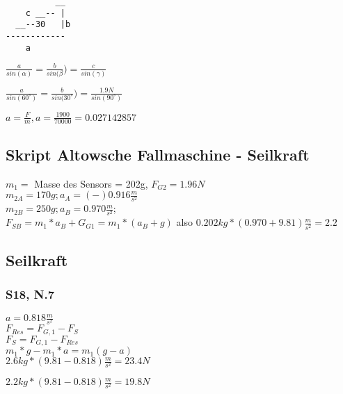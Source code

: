 \documentclass[11pt,twoside,a4paper]{article}
\begin{document}
        \begin{verbatim}
          __
    c __-- |
  __--30   |b
------------
    a
        \end{verbatim}

        \(\frac{a}{sin(\alpha)} = \frac{b}{sin(\beta}) = \frac{c}{sin(\gamma)}\)

        \(\frac{a}{sin(60^\circ)} = \frac{b}{sin(30^\circ}) = \frac{1.9N}{sin(90^\circ)}\)

        \(a = \frac{F}{m}, a = \frac{1900}{70000} = 0.027142857\)

        \subsection{Skript Altowsche Fallmaschine - Seilkraft}


        \(m_1 = \) Masse des Sensors = 202g, \(F_{G2} = 1.96N\)\\
        \(m_{2A} = 170g; a_A = (-)0.916\frac{m}{s^2}\)\\
        \(m_{2B} = 250g; a_B = 0.970\frac{m}{s^2}\);\\


        \(F_{SB} = m_1 * a_B + G_{G1} = m_1 * (a_B + g)\) also \(0.202kg * (0.970 + 9.81)\frac{m}{s^2} = 2.2\)

        \subsection{Seilkraft}
        \subsubsection{S18, N.7}

        \(a = 0.818\frac{m}{s^2}\)\\
        \(F_{Res} = F_{G,1} - F_S\)\\
        \(F_S = F_{G,1} - F_{Res}\)\\
        \(m_1 * g - m_1 * a = m_1(g-a)\)\\
        \(2.6kg * (9.81 - 0.818) \frac{m}{s^2} = 23.4N\)

        \(2.2kg * (9.81 - 0.818) \frac{m}{s^2} = 19.8N\)
        
\end{document}
